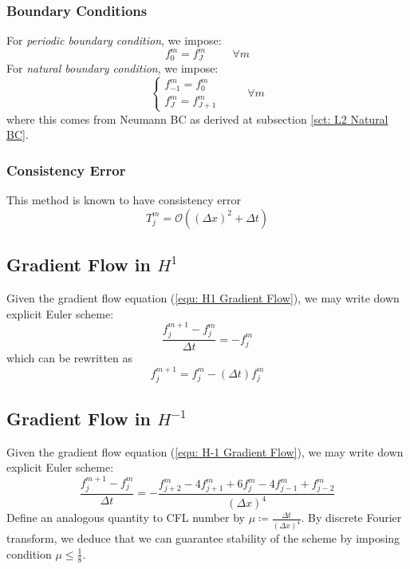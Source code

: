\documentclass[a4paper]{article}
\theoremstyle{definition}
\begin{document}
\subsubsection{Boundary Conditions}
For \emph{periodic boundary condition}, we impose:
\begin{equation*}
    f_0^{m} = f_{J}^m \hspace{1cm} \forall m
\end{equation*}
For \emph{natural boundary condition}, we impose:
\begin{equation*}
    \begin{cases}
        f_{-1}^m = f_{0}^m \\
        f_{J}^m = f_{J+1}^m
    \end{cases}
    \hspace{1cm}
    \forall m
\end{equation*}
where this comes from Neumann BC as derived at subsection \ref{sct: L2 Natural BC}.

\subsubsection{Consistency Error}
This method is known to have consistency error
\begin{equation}
    T_j^m = \mathcal{O}\left( \left( \Delta x \right)^2 + \Delta t \right)
    \label{L2 Consistency Error}
\end{equation}

\subsection{Gradient Flow in $H^1$}
Given the gradient flow equation (\ref{equ: H1 Gradient Flow}),
we may write down explicit Euler scheme:
\begin{equation}
    \frac{f_j^{m+1} - f_j^m}{\Delta t} = -f_{j}^m
    \label{equ: H1 Numeric}
\end{equation}
which can be rewritten as
\begin{equation}
    f_j^{m+1} = f_j^m - (\Delta t)f_j^m
\end{equation}

\subsection{Gradient Flow in $H^{-1}$}
Given the gradient flow equation (\ref{equ: H-1 Gradient Flow}),
we may write down explicit Euler scheme:
\begin{equation}
    \frac{f_j^{m+1} - f_j^m}{\Delta t} = -\frac{f_{j+2}^m - 4 f_{j+1}^m + 6 f_j^m - 4 f_{j-1}^m + f_{j-2}^m}{(\Delta x)^4}
    \label{equ: H-1 Numeric}
\end{equation}
Define an analogous quantity to CFL number by $\mu \coloneqq \frac{\Delta t}{\left( \Delta x \right)^4}$. By discrete Fourier transform, we deduce that we can guarantee stability of the scheme by imposing condition $\mu \leq \frac{1}{8}$.
\end{document}
